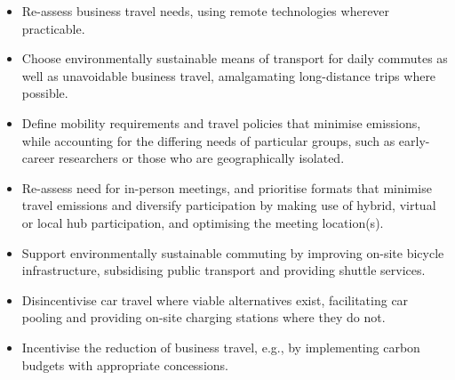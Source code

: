 \documentclass[../SustainableHEP.tex]{subfiles}
\begin{document}
\newpage
\begin{reco2}{\currentname}
{
\begin{itemize}[leftmargin=6 mm]
\item Re-assess business travel needs, using remote technologies wherever practicable.
\item Choose environmentally sustainable means of transport for daily commutes as well as unavoidable business travel, amalgamating long-distance trips where possible.
\end{itemize}
}
{
\begin{itemize}[leftmargin=6 mm]
\item Define mobility requirements and travel policies that minimise emissions, while accounting for the differing needs of particular groups, such as early-career researchers or those who are geographically isolated.

\item Re-assess need for in-person meetings, and prioritise formats that minimise travel emissions and diversify participation by making use of hybrid, virtual or local hub participation, and optimising the meeting location(s).
\end{itemize}
}
{
\begin{itemize}[leftmargin=6 mm]
\item Support environmentally sustainable commuting by improving on-site bicycle infrastructure, subsidising public transport and providing shuttle services.

\item Disincentivise car travel where viable alternatives exist, facilitating car pooling and providing on-site charging stations where they do not.

\item Incentivise the reduction of business travel, e.g., by implementing carbon budgets with appropriate concessions.


\end{itemize}}
\end{reco2}
\end{document}
